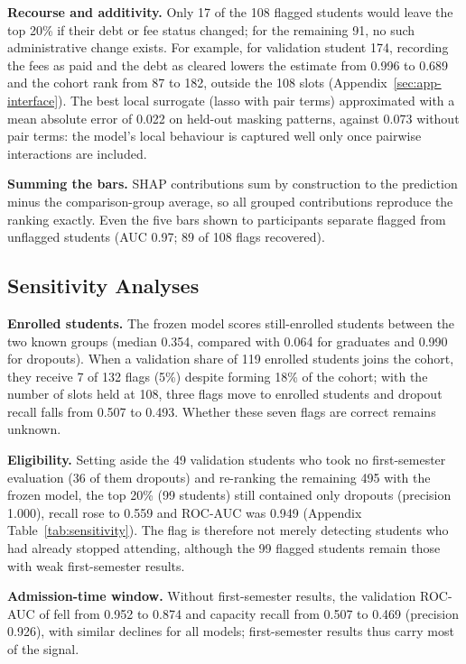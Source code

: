 \textbf{Recourse and additivity.} Only 17 of the 108 flagged students would leave the top 20\% if
their debt or fee status changed; for the remaining 91, no such administrative change exists. For
example, for validation student 174, recording the fees as paid and the debt as cleared lowers the
estimate from 0.996 to 0.689 and the cohort rank from 87 to 182, outside the 108 slots
(Appendix~\ref{sec:app-interface}). The
best local surrogate (lasso with pair terms) approximated \tabicl with a mean absolute error of 0.022
on held-out masking patterns, against 0.073 without pair terms: the model's local behaviour is
captured well only once pairwise interactions are included.

\textbf{Summing the bars.} SHAP contributions sum by construction to the prediction minus the
comparison-group average, so all grouped contributions reproduce the ranking exactly. Even the five
bars shown to participants separate flagged from unflagged students (AUC 0.97; 89 of 108 flags
recovered).

\subsection{Sensitivity Analyses}
\label{sec:sensitivity}

\textbf{Enrolled students.} The frozen model scores still-enrolled students between the two known
groups (median 0.354, compared with 0.064 for graduates and 0.990 for dropouts). When a validation
share of 119 enrolled students joins the cohort, they receive 7 of 132 flags (5\%) despite forming
18\% of the cohort; with the number of slots held at 108, three flags move to enrolled students and
dropout recall falls from 0.507 to 0.493. Whether these seven flags are correct remains
unknown.

\textbf{Eligibility.} Setting aside the 49 validation students who took no first-semester
evaluation (36 of them dropouts) and re-ranking the remaining 495 with the frozen model, the top 20\%
(99 students) still contained only dropouts (precision 1.000), recall rose to 0.559 and ROC-AUC was
0.949 (Appendix Table~\ref{tab:sensitivity}). The flag is therefore not merely detecting students
who had already stopped attending, although the 99 flagged students remain those with weak
first-semester results.

\textbf{Admission-time window.} Without first-semester results, the validation ROC-AUC of \tabicl
fell from 0.952 to 0.874 and capacity recall from 0.507 to 0.469 (precision 0.926), with similar
declines for all models; first-semester results thus carry most of the signal.

